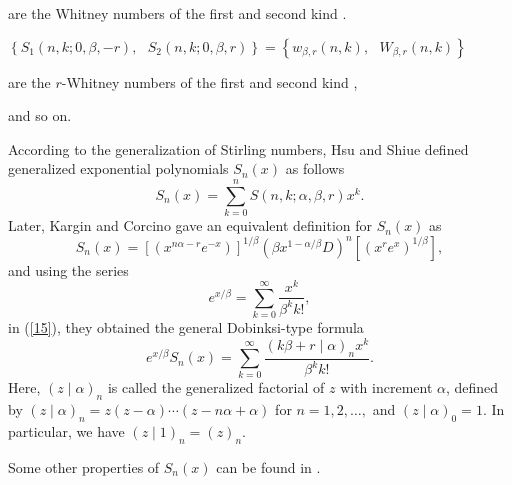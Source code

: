 \documentclass{article}%
\begin{document}
\begin{description}
\item are the Whitney numbers of the first and second kind \cite{Benoumhani2}.

\item[vi.] $\left\{  S_{1}\left(  n,k;0,\beta,-r\right)  ,\text{ }S_{2}\left(
n,k;0,\beta,r\right)  \right\}  =\left\{  w_{\beta,r}\left(  n,k\right)
,\text{ }W_{\beta,r}\left(  n,k\right)  \right\}  $

\item are the $r$-Whitney numbers of the first and second kind \cite{Mezo2},
\end{description}

and so on.

According to the generalization of Stirling numbers, Hsu and Shiue \cite{HSU}
defined generalized exponential polynomials $S_{n}\left(  x\right)  $ as
follows%
\begin{equation}
S_{n}\left(  x\right)  =\sum_{k=0}^{n}S\left(  n,k;\alpha,\beta,r\right)
x^{k}. \label{6}%
\end{equation}
Later, Kargin and Corcino \cite{Kargin} gave an equivalent definition for
$S_{n}\left(  x\right)  $ as%
\begin{equation}
S_{n}\left(  x\right)  =\left[  \left(  x^{n\alpha-r}e^{-x}\right)  \right]
^{1/\beta}\left(  \beta x^{1-\alpha/\beta}D\right)  ^{n}\left[  \left(
x^{r}e^{x}\right)  ^{1/\beta}\right]  , \label{15}%
\end{equation}
and using the series%
\[
e^{x/\beta}=\sum_{k=0}^{\infty}\frac{x^{k}}{\beta^{k}k!},
\]
in (\ref{15}), they obtained the general Dobinksi-type formula \cite{HSU}%
\begin{equation}
e^{x/\beta}S_{n}\left(  x\right)  =\sum_{k=0}^{\infty}\frac{\left(
k\beta+r\mid\alpha\right)  _{n}x^{k}}{\beta^{k}k!}. \label{16}%
\end{equation}
Here, $\left(  z\mid\alpha\right)  _{n}$ is called the generalized factorial
of $z$ with increment $\alpha$, defined by $\left(  z\mid\alpha\right)
_{n}=z\left(  z-\alpha\right)  \cdots\left(  z-n\alpha+\alpha\right)  $ for
$n=1,2,\ldots,$ and $\left(  z\mid\alpha\right)  _{0}=1.$ In particular, we
have $\left(  z\mid1\right)  _{n}=\left(  z\right)  _{n}.$

Some other properties of $S_{n}\left(  x\right)  $ can be found in
\cite{Corcino4, Corcino5, HSU, Aimin}.
\end{document}

